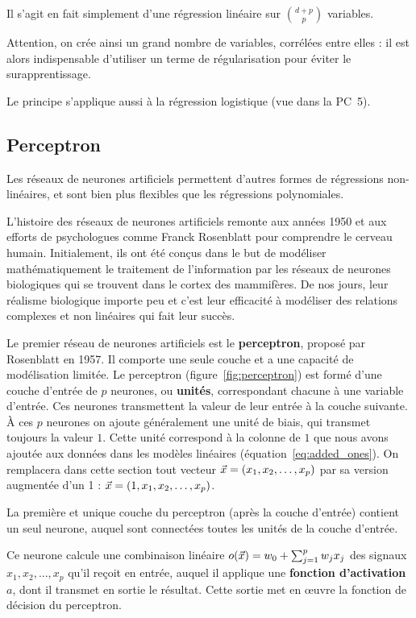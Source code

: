 Il s'agit en fait simplement d'une régression linéaire sur ${d+p \choose p}$ variables.

Attention, on crée ainsi un grand nombre de variables, corrélées entre elles :
il est alors indispensable d'utiliser un terme de régularisation pour éviter le
surapprentissage.

Le principe s'applique aussi à la régression logistique (vue dans la PC~5).


\subsection{Perceptron}
Les réseaux de neurones artificiels permettent d'autres formes de régressions
non-linéaires, et sont bien plus flexibles que les régressions polynomiales.


L'histoire des réseaux de neurones artificiels remonte aux années 1950 et aux
efforts de psychologues comme Franck Rosenblatt pour comprendre le cerveau
humain. Initialement, ils ont été conçus dans le but de modéliser
mathématiquement le traitement de l'information par les réseaux de neurones
biologiques qui se trouvent dans le cortex des mammifères. De nos jours, leur
réalisme biologique importe peu et c'est leur efficacité à modéliser des
relations complexes et non linéaires qui fait leur succès.
  
Le premier réseau de neurones artificiels est le \textbf{perceptron}, proposé
par Rosenblatt en 1957. Il comporte une seule couche et a une capacité de
modélisation limitée.
Le perceptron (figure~\ref{fig:perceptron}) est formé d'une couche d'entrée de
$p$ neurones, ou \textbf{unités}, correspondant chacune à une variable
d'entrée. Ces neurones transmettent la valeur de leur entrée à la couche
suivante.  À ces $p$ neurones on ajoute généralement une unité de biais, qui
transmet toujours la valeur $1$. Cette unité correspond à la colonne de $1$ que
nous avons ajoutée aux données dans les modèles linéaires
(équation~\eqref{eq:added_ones}). On remplacera dans cette section tout vecteur
$\xx = (x_1, x_2, \dots, x_p)$ par sa version augmentée d'un 1 :
$\xx = (1, x_1, x_2, \dots, x_p)$.

La première et unique couche du perceptron (après la couche d'entrée) contient
un seul neurone, auquel sont connectées toutes les unités de la couche
d'entrée.

Ce neurone calcule une combinaison linéaire
$o(\xx) = w_0 + \sum_{j=1}^p w_j x_j$ des signaux $x_1, x_2,  \dots, x_p$
qu'il reçoit en entrée, auquel il applique une \textbf{fonction d'activation}
$a$, dont il transmet en sortie le résultat. Cette sortie met en {\oe}uvre la
fonction de décision du perceptron.

